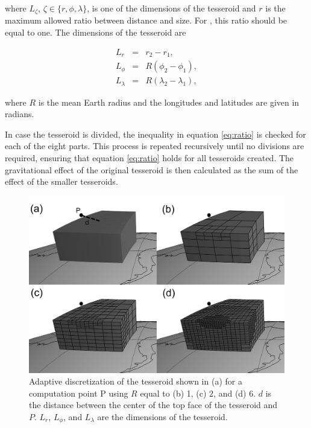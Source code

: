 \documentclass[extra]{gji}
\begin{document}
\noindent
where
$L_\zeta$, $\zeta \in \{r, \phi, \lambda\}$,
is one of the dimensions of the tesseroid
and
$r$ is the maximum allowed ratio between distance and size.
For \citet{Ku1977}, this ratio should be equal to one.
The dimensions of the tesseroid are

\begin{eqnarray*}
    L_r &=& r_2 - r_1,\\
    L_\phi &=& R(\phi_2 - \phi_1),\\
    L_\lambda &=& R(\lambda_2 - \lambda_1),
\end{eqnarray*}

\noindent
where $R$ is the mean Earth radius
and the longitudes and latitudes are given in radians.

In case the tesseroid is divided,
the inequality in equation \ref{eq:ratio}
is checked for each of the eight parts.
This process is repeated recursively
until no divisions are required,
ensuring that equation \ref{eq:ratio}
holds for all tesseroids created.
The gravitational effect
of the original tesseroid
is then calculated as
the sum of the effect
of the smaller tesseroids.

\begin{figure}
    \centering
    \includegraphics[width=\columnwidth]{figs/tesseroid-split}
    \caption{
        Adaptive discretization
        of the tesseroid shown in (a)
        for a computation point P
        using $R$ equal to
        (b) 1, (c) 2, and (d) 6.
        $d$ is the distance between
        the center of the top face of the tesseroid
        and $P$.
        $L_r$, $L_\phi$, and $L_\lambda$ are the dimensions of the tesseroid.
    }
    \label{fig:ratio}
\end{figure}
\end{document}
